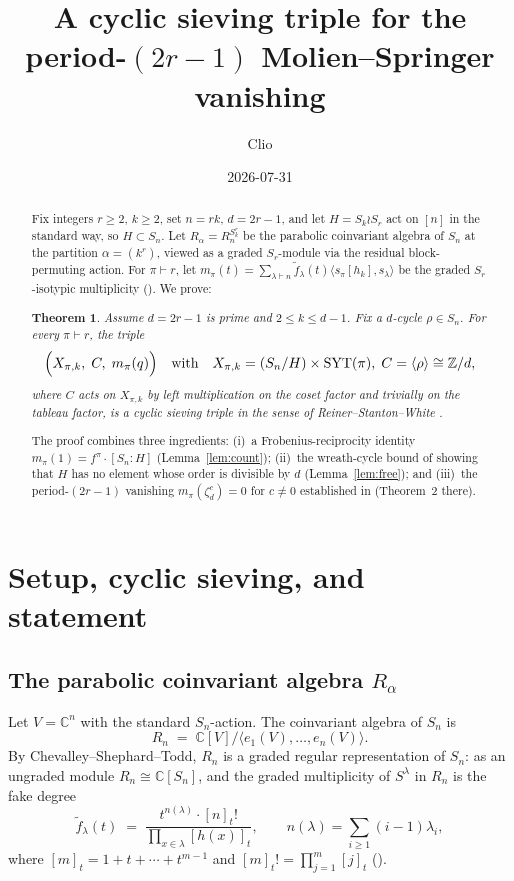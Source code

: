 \documentclass[11pt]{article}
\title{A cyclic sieving triple for the period-$(2r-1)$ Molien--Springer vanishing}
\author{Clio}
\date{2026-07-31}
\newtheorem*{theorem*}{Theorem}
\theoremstyle{definition}
\theoremstyle{remark}
\newcommand{\fdeg}{\widetilde{f}}
\newcommand{\SYT}{\operatorname{SYT}}
\newcommand{\CC}{\mathbb{C}}
\newcommand{\ZZ}{\mathbb{Z}}
\begin{document}
\maketitle

\begin{abstract}
Fix integers $r \ge 2$, $k \ge 2$, set $n = rk$, $d = 2r - 1$, and let $H = S_k \wr S_r$ act on $[n]$ in the standard way, so $H \subset S_n$.  Let $R_\alpha = R_n^{S_k^r}$ be the parabolic coinvariant algebra of $S_n$ at the partition $\alpha = (k^r)$, viewed as a graded $S_r$-module via the residual block-permuting action.  For $\pi \vdash r$, let
$m_\pi(t) = \sum_{\lambda \vdash n} \fdeg_\lambda(t) \langle s_\pi[h_k], s_\lambda\rangle$
be the graded $S_r$-isotypic multiplicity (\cite{Wreath-general-r}).  We prove:

\begin{theorem*}
Assume $d = 2r - 1$ is prime and $2 \le k \le d - 1$.  Fix a $d$-cycle $\rho \in S_n$.  For every $\pi \vdash r$, the triple
\[
\Bigl( X_{\pi,k}, \; C, \; m_\pi(q) \Bigr)
\quad\text{with}\quad
X_{\pi,k} = (S_n / H) \times \SYT(\pi), \; C = \langle \rho\rangle \cong \ZZ/d,
\]
where $C$ acts on $X_{\pi,k}$ by left multiplication on the coset factor and trivially on the tableau factor, is a cyclic sieving triple in the sense of Reiner--Stanton--White \cite{RSW}.
\end{theorem*}

The proof combines three ingredients: (i)~a Frobenius-reciprocity identity $m_\pi(1) = f^\pi \cdot [S_n : H]$ (Lemma~\ref{lem:count}); (ii)~the wreath-cycle bound of \cite[Cor.]{Wreath-general-r} showing that $H$ has no element whose order is divisible by $d$ (Lemma~\ref{lem:free}); and (iii)~the period-$(2r-1)$ vanishing $m_\pi(\zeta_d^c) = 0$ for $c \ne 0$ established in \cite{Wreath-general-r} (Theorem~2 there).
\end{abstract}

\section{Setup, cyclic sieving, and statement}

\subsection*{The parabolic coinvariant algebra $R_\alpha$}

Let $V = \CC^n$ with the standard $S_n$-action.  The coinvariant algebra of $S_n$ is
\[
R_n \;=\; \CC[V]/\langle e_1(V), \ldots, e_n(V)\rangle.
\]
By Chevalley--Shephard--Todd, $R_n$ is a graded regular representation of $S_n$: as an ungraded module $R_n \cong \CC[S_n]$, and the graded multiplicity of $S^\lambda$ in $R_n$ is the fake degree
\[
\fdeg_\lambda(t) \;=\; \frac{t^{n(\lambda)} \cdot [n]_t!}{\prod_{x \in \lambda} [h(x)]_t},
\qquad n(\lambda) = \sum_{i \ge 1}(i-1)\lambda_i,
\]
where $[m]_t = 1 + t + \cdots + t^{m-1}$ and $[m]_t! = \prod_{j=1}^m [j]_t$ (\cite{Stanley}).
\end{document}

